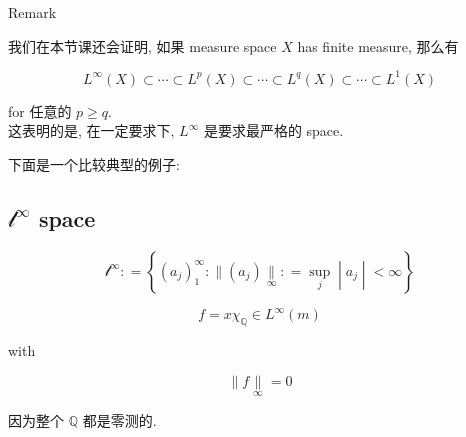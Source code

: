 \begin{qlremark}{Remark}

我们在本节课还会证明, 如果 measure space \(X\) has finite measure, 那么有

\[L^{\infty}(X) \subset \cdots \subset L^{p}(X) \subset \cdots \subset L^{q}(X) \subset \cdots \subset L^{1}(X)\]

for 任意的 \(p \geq q\).\\
这表明的是, 在一定要求下, \(L^{\infty}\) 是要求最严格的 space.

\end{qlremark}

下面是一个比较典型的例子:

\subsection{\texorpdfstring{\(\mathcal{l}^{\infty}\) space}{\textbackslash mathcal\{l\}\^{}\{\textbackslash infty\} space}}

\begin{definition}{}

\[\mathcal{l}^{\infty}: = \left\{ (a_{j})_{1}^{\infty}: \parallel (a_{j})\underset{\infty}{\parallel}: = \sup\limits_{j} \middle| a_{j} \middle| < \infty \right\}\]

\end{definition}

\begin{example}

\[f = x\chi_{\mathbb{Q}} \in L^{\infty}(m)\]

with

\[\parallel f\underset{\infty}{\parallel} = 0\]

因为整个 \(\mathbb{Q}\) 都是零测的.

\end{example}

